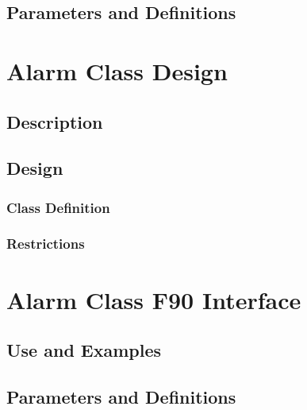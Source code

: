 \documentclass[]{article}
\begin{document}
\subsection{Parameters and Definitions}





\section{Alarm Class Design}

\subsection{Description}


\subsection{Design}


\subsubsection{Class Definition}


\subsubsection{Restrictions}
%

\section{Alarm Class F90 Interface}

\subsection{Use and Examples}


\subsection{Parameters and Definitions}
%


\end{document}
